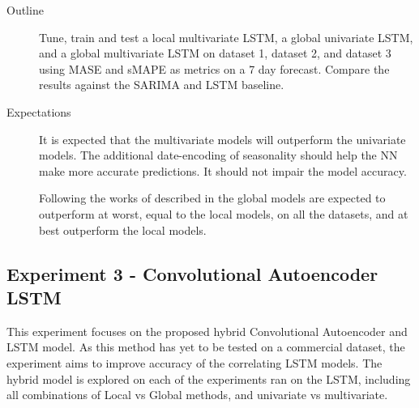 \begin{description}
  \item[Outline]{
              Tune, train and test a local multivariate LSTM, a global univariate LSTM,
              and a global multivariate LSTM on dataset 1,
              dataset 2, and dataset 3 using MASE and sMAPE as metrics on a 7 day forecast.
              Compare the results against the SARIMA and LSTM baseline.
        }
\end{description}

\begin{description}
  \item[Expectations]{
              It is expected that the multivariate models will outperform the univariate models.
              The additional date-encoding of seasonality should help the NN make more accurate predictions.
              It should not impair the model accuracy.

              Following the works of \cite{Montero-Manso2021} described in 
              the global models are expected to outperform at worst, equal to the local models, on all the datasets, and at best outperform the local models.

        }
\end{description}





\subsection{Experiment 3 - Convolutional Autoencoder LSTM}
This experiment focuses on the proposed hybrid Convolutional Autoencoder and LSTM model.
As this method has yet to be tested on a commercial dataset,
the experiment aims to improve accuracy of the correlating LSTM models.
The hybrid model is explored on each of the experiments ran on the LSTM,
including all combinations of Local vs Global methods, and univariate vs multivariate.

